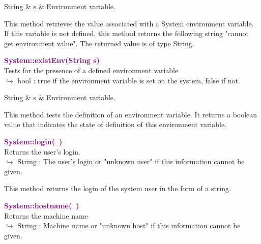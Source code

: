 \begin{tcolorbox}[width=\textwidth,myArgs,tabularx={ll|R}]
String & s & Environment variable.
\end{tcolorbox}

This method retrieves the value associated with a System environment variable. If this variable is not defined, this method returns the following string "cannot get environment value". The returned value is of type String.

\textcolor{purple}{\textbf{System::existEnv(String s)}}\label{System::existEnv(String s)}\\
Tests for the presence of a defined environment variable\\ \hspace*{10mm}$\hookrightarrow$ bool : true if the environment variable is set on the system, false if not.

\begin{tcolorbox}[width=\textwidth,myArgs,tabularx={ll|R}]
String & s & Environment variable.
\end{tcolorbox}

This method tests the definition of an environment variable. It returns a boolean value that indicates the state of definition of this environment variable.

\textcolor{purple}{\textbf{System::login(~)}}\label{System::login()}\\
Returns the user's login.\\ \hspace*{10mm}$\hookrightarrow$ String : The user's login or "unknown user" if this information cannot be given.

This method returns the login of the system user in the form of a string.

\textcolor{purple}{\textbf{System::hostname(~)}}\label{System::hostname()}\\
Returns the machine name\\ \hspace*{10mm}$\hookrightarrow$ String : Machine name or "unknown host" if this information cannot be given.

